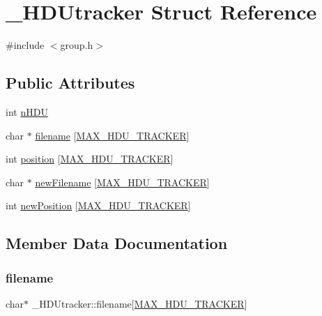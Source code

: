 \hypertarget{struct___h_d_utracker}{}\section{\+\_\+\+H\+D\+Utracker Struct Reference}
\label{struct___h_d_utracker}


{\ttfamily \#include $<$group.\+h$>$}

\subsection*{Public Attributes}
\begin{DoxyCompactItemize}
\item 
int \hyperlink{struct___h_d_utracker_a30ea2e4f133d4e1605b3f817812d71fe}{n\+H\+DU}
\item 
char $\ast$ \hyperlink{struct___h_d_utracker_a9a84348bb34e3428bd0e36003c1c34c2}{filename} \mbox{[}\hyperlink{group_8h_ae621b895b028869926620e7906317920}{M\+A\+X\+\_\+\+H\+D\+U\+\_\+\+T\+R\+A\+C\+K\+ER}\mbox{]}
\item 
int \hyperlink{struct___h_d_utracker_a88f5a26c8626e7398894c1d041aac0f1}{position} \mbox{[}\hyperlink{group_8h_ae621b895b028869926620e7906317920}{M\+A\+X\+\_\+\+H\+D\+U\+\_\+\+T\+R\+A\+C\+K\+ER}\mbox{]}
\item 
char $\ast$ \hyperlink{struct___h_d_utracker_a2c769600d37c8d961e3320142f55c7fa}{new\+Filename} \mbox{[}\hyperlink{group_8h_ae621b895b028869926620e7906317920}{M\+A\+X\+\_\+\+H\+D\+U\+\_\+\+T\+R\+A\+C\+K\+ER}\mbox{]}
\item 
int \hyperlink{struct___h_d_utracker_a1b04765d456c7af8efbe85674442eb21}{new\+Position} \mbox{[}\hyperlink{group_8h_ae621b895b028869926620e7906317920}{M\+A\+X\+\_\+\+H\+D\+U\+\_\+\+T\+R\+A\+C\+K\+ER}\mbox{]}
\end{DoxyCompactItemize}


\subsection{Member Data Documentation}
\mbox{\label{struct___h_d_utracker_a9a84348bb34e3428bd0e36003c1c34c2}} 
\subsubsection{\texorpdfstring{filename}{filename}}
{\footnotesize\ttfamily char$\ast$ \+\_\+\+H\+D\+Utracker\+::filename\mbox{[}\hyperlink{group_8h_ae621b895b028869926620e7906317920}{M\+A\+X\+\_\+\+H\+D\+U\+\_\+\+T\+R\+A\+C\+K\+ER}\mbox{]}}

